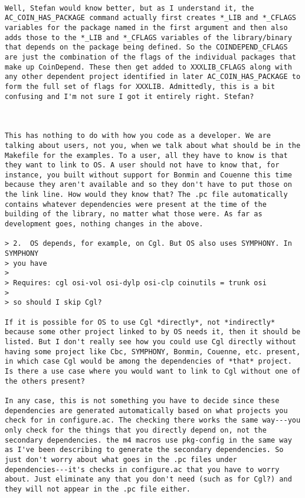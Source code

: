 \begin{verbatim}

Well, Stefan would know better, but as I understand it, the
AC_COIN_HAS_PACKAGE command actually first creates *_LIB and *_CFLAGS
variables for the package named in the first argument and then also
adds those to the *_LIB and *_CFLAGS variables of the library/binary
that depends on the package being defined. So the COINDEPEND_CFLAGS
are just the combination of the flags of the individual packages that
make up CoinDepend. These then get added to XXXLIB_CFLAGS along with
any other dependent project identified in later AC_COIN_HAS_PACKAGE to
form the full set of flags for XXXLIB. Admittedly, this is a bit
confusing and I'm not sure I got it entirely right. Stefan?



This has nothing to do with how you code as a developer. We are
talking about users, not you, when we talk about what should be in the
Makefile for the examples. To a user, all they have to know is that
they want to link to OS. A user should not have to know that, for
instance, you built without support for Bonmin and Couenne this time
because they aren't available and so they don't have to put those on
the link line. How would they know that? The .pc file automatically
contains whatever dependencies were present at the time of the
building of the library, no matter what those were. As far as
development goes, nothing changes in the above.

> 2.  OS depends, for example, on Cgl. But OS also uses SYMPHONY. In SYMPHONY
> you have
>
> Requires: cgl osi-vol osi-dylp osi-clp coinutils = trunk osi
>
> so should I skip Cgl?

If it is possible for OS to use Cgl *directly*, not *indirectly*
because some other project linked to by OS needs it, then it should be
listed. But I don't really see how you could use Cgl directly without
having some project like Cbc, SYMPHONY, Bonmin, Couenne, etc. present,
in which case Cgl would be among the dependencies of *that* project.
Is there a use case where you would want to link to Cgl without one of
the others present?

In any case, this is not something you have to decide since these
dependencies are generated automatically based on what projects you
check for in configure.ac. The checking there works the same way---you
only check for the things that you directly depend on, not the
secondary dependencies. the m4 macros use pkg-config in the same way
as I've been describing to generate the secondary dependencies. So
just don't worry about what goes in the .pc files under
dependencies---it's checks in configure.ac that you have to worry
about. Just eliminate any that you don't need (such as for Cgl?) and
they will not appear in the .pc file either.


\end{verbatim}
